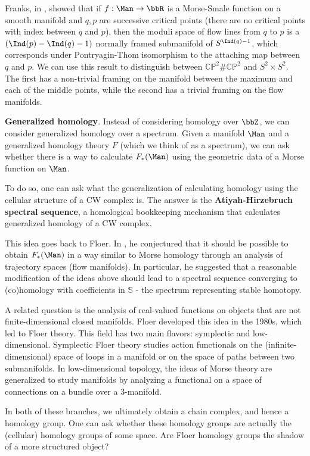 Franks, in \cite{franks1979morse}, showed that if $f:\Man \to \bbR$ is a Morse-Smale function on a smooth manifold and $q,p$ are successive critical points (there are no critical points with index between $q$ and $p$), then the moduli space of flow lines from $q$ to $p$ is a $(\Ind(p)-\Ind(q)-1)$ normally framed submanifold of $S^{\Ind(q)-1}$, which corresponds under Pontryagin-Thom isomorphism to the attaching map between $q$ and $p$. We can use this result to distinguish between $\mathbb{CP}^2 \# \mathbb{CP}^2$ and $S^2 \times S^2$. The first has a non-trivial framing on the manifold between the maximum and each of the middle points, while the second has a trivial framing on the flow manifolds.

\textbf{Generalized homology}. Instead of considering homology over $\bbZ$, we can consider generalized homology over a spectrum. Given a manifold $\Man$ and a generalized homology theory $F$ (which we think of as a spectrum), we can ask whether there is a way to calculate $F_*(\Man)$ using the geometric data of a Morse function on $\Man$.

To do so, one can ask what the generalization of calculating homology using the cellular structure of a CW complex is. The answer is the \textbf{Atiyah-Hirzebruch spectral sequence}, a homological bookkeeping mechanism that calculates generalized homology of a CW complex.

This idea goes back to Floer. In \cite{floer1989witten}, he conjectured that it should be possible to obtain $F_*(\Man)$ in a way similar to Morse homology through an analysis of trajectory spaces (flow manifolds). In particular, he suggested that a reasonable modification of the ideas above should lead to a spectral sequence converging to (co)homology with coefficients in $\mathbb{S}$ - the spectrum representing stable homotopy.

A related question is the analysis of real-valued functions on objects that are not finite-dimensional closed manifolds. Floer developed this idea in the 1980s, which led to Floer theory. This field has two main flavors: symplectic and low-dimensional. Symplectic Floer theory studies action functionals on the (infinite-dimensional) space of loops in a manifold or on the space of paths between two submanifolds. In low-dimensional topology, the ideas of Morse theory are generalized to study manifolds by analyzing a functional on a space of connections on a bundle over a 3-manifold. 

In both of these branches, we ultimately obtain a chain complex, and hence a homology group. One can ask whether these homology groups are actually the (cellular) homology groups of some space. Are Floer homology groups the shadow of a more structured object?

